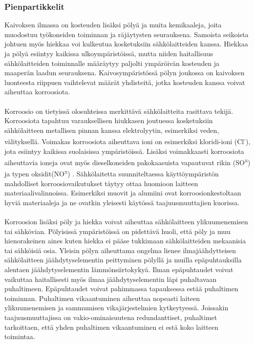 \documentclass[finnish,12pt,a4paper,pdftex,elec,utf8]{aaltothesis}
\begin{document}
\subsubsection{Pienpartikkelit}
Kaivoksen ilmassa on kosteuden lisäksi pölyä ja muita kemikaaleja, joita muodostuu työkoneiden toiminnan ja räjäytysten seurauksena. Samoista seikoista johtuen myös hiekkaa voi kulkeutua kosketuksiin sähkölaitteiden kanssa. Hiekkaa ja pölyä esiintyy kaikissa ulkoympäristöissä, mutta niiden haitallisuus sähkölaitteiden toiminnalle määräytyy paljolti ympäröivän kosteuden ja maaperän laadun seurauksena. Kaivosympäristössä pölyn joukossa on kaivoksen luonteesta riippuen vaihtelevat määrät yhdisteitä, jotka kosteuden kanssa voivat aiheuttaa korroosiota. \cite[s. 290]{Hakapää}
\\\\
Korroosio on tietyissä olosuhteissa merkittävä sähkölaitteita rasittava tekijä. Korroosiota tapahtuu varauksellisen hiukkasen joutuessa kosketuksiin sähkölaitteen metallisen pinnan kanssa elektrolyytin, esimerkiksi veden, välityksellä. Voimakas korroosiota aiheuttava ioni on esimerkiksi kloridi-ioni (Cl\textsuperscript{-}), jota esiintyy kaikissa suolaisissa ympäristöissä. Lisäksi voimakkaasti korroosiota aiheuttavia ioneja ovat myös dieselkoneiden pakokaasuista vapautuvat rikin (SO\textsuperscript{x}) ja typen oksidit(NO\textsuperscript{x}) \cite[s. 290]{Hakapää}. Sähkölaitetta suunniteltaessa käyttöympäristön mahdolliset korroosiovaikutukset täytyy ottaa huomioon laitteen materiaalivalinnoissa. Esimerkiksi muovit ja alumiini ovat korroosionkestoltaan hyviä materiaaleja ja ne ovatkin yleisesti käytössä taajuusmuuttajien kuorissa.
\\\\
Korroosion lisäksi pöly ja hiekka voivat aiheuttaa sähkölaitteen ylikuumenemisen tai sähkövian. Pölyisissä ympäristöissä on pidettävä huoli, että pöly ja muu hienorakeinen aines kuten hiekka ei pääse tukkimaan sähkölaitteiden mekaanisia tai sähköisiä osia. Yleisin pölyn aiheuttama ongelma lienee ilmajäähdytteisen sähkölaitteen jäähdytyselementin peittyminen pölyllä ja muilla epäpuhtauksilla alentaen jäähdytyselementin lämmönsiirtokykyä. Ilman epäpuhtaudet voivat vaikuttaa haitallisesti myös ilmaa jäähdytyselementin läpi puhaltavaan puhaltimeen. Epäpuhtaudet voivat pahimmassa tapauksessa estää puhaltimen toiminnan. \cite{Pallasmaa} Puhaltimen vikaantuminen aiheuttaa nopeasti laiteen ylikuumenemisen ja sammumisen vikajärjestelmien kytkeytyessä. Joissakin taajuusmuuttajissa on vakio-ominaisuutena redundanttiset, puhaltimet tarkoittaen, että yhden puhaltimen vikaantuminen ei estä koko laitteen toimintaa.
\end{document}
